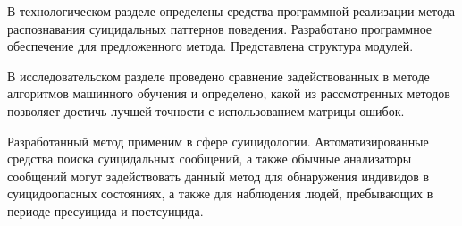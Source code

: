 В технологическом разделе определены средства программной реализации метода распознавания суицидальных паттернов поведения. 
Разработано программное обеспечение для предложенного метода. 
Представлена структура модулей.


В исследовательском разделе проведено сравнение задействованных в методе алгоритмов машинного обучения и определено, какой из рассмотренных методов позволяет достичь лучшей точности с использованием матрицы ошибок. 


Разработанный метод применим в сфере суицидологии. 
Автоматизированные средства поиска суицидальных сообщений, а также обычные анализаторы сообщений могут задействовать данный метод для обнаружения индивидов в суицидоопасных состояниях, а также для наблюдения людей, пребывающих в периоде пресуицида и постсуицида.

\pagebreak